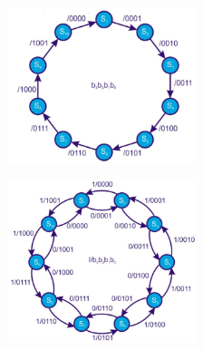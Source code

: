 \begin{enumerate}
	\begin{minipage}{.5\textwidth}
		\centering
		\includegraphics[width=5.5cm]{figures/ch17/design4.jpg}
		\label{fig:design4}
	\end{minipage}%
	\begin{minipage}{.5\textwidth}
		\centering
		\includegraphics[width=5.5cm]{figures/ch17/design5.jpg}
		\label{fig:design5}
	\end{minipage}
\end{enumerate}


